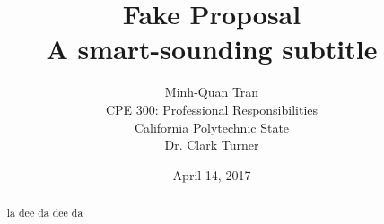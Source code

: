 


\title{\vfill Fake Proposal\\
\vspace{8pt}
\normalsize{A smart-sounding subtitle}
}

\author{Minh-Quan Tran\\
\normalsize{CPE 300: Professional Responsibilities}\\
\normalsize{California Polytechnic State}\\
\normalsize{Dr. Clark Turner}
}

\date{April 14, 2017}

\maketitle


\vfill

\begin{abstract}

la dee da dee da
\end{abstract}

\thispagestyle{empty} 
\pagebreak